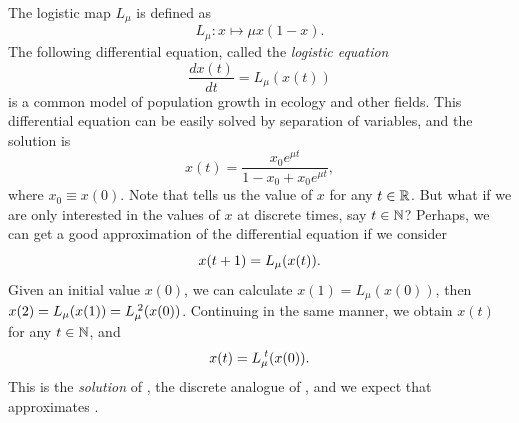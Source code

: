 \documentclass[10pt,twoside,draft]{book}
\begin{document}
The logistic map $L_\mu$ is defined as 
\begin{equation*}
  L_{\mu}: x \mapsto \mu x(1-x).
\end{equation*}
The following differential equation, called the \textit{logistic equation}
\begin{equation}
  \frac{dx(t)}{dt} = L_{\mu}(x(t))
  \label{eqn:lde}
\end{equation}
is a common model of population growth in ecology and other fields.
This differential equation can be easily solved by separation of variables, and the solution is
\begin{equation}
  x(t) = \frac{x_0 e^{\mu t}}{1 - x_0 + x_0 e^{\mu t}},
  \label{eqn:ldesoln}
\end{equation}
where $x_0 \equiv x(0)$.
Note that  tells us the value of $x$ for any $t \in \mathbb{R}$.
But what if we are only interested in the values of $x$ at discrete times, say $t \in \mathbb{N}$?
Perhaps, we can get a good approximation of the differential equation if we consider
\begin{equation}
  x(t + 1) = L_{\mu}(x(t)).
  \label{eqn:logistic}
  \index{logistic map}
\end{equation}
Given an initial value $x(0)$, we can calculate $x(1) = L_\mu(x(0))$, then $x(2) = L_\mu(x(1)) = L_\mu^{\;2}(x(0))$.
Continuing in the same manner, we obtain $x(t)$ for any $t \in \mathbb{N}$, and 
\begin{equation}
  x(t) = L_\mu^{\;t}(x(0)).
  \label{eqn:logisticsoln}
\end{equation}
This is the \textit{solution} of , the discrete analogue of , and we expect that  approximates .
\end{document}
